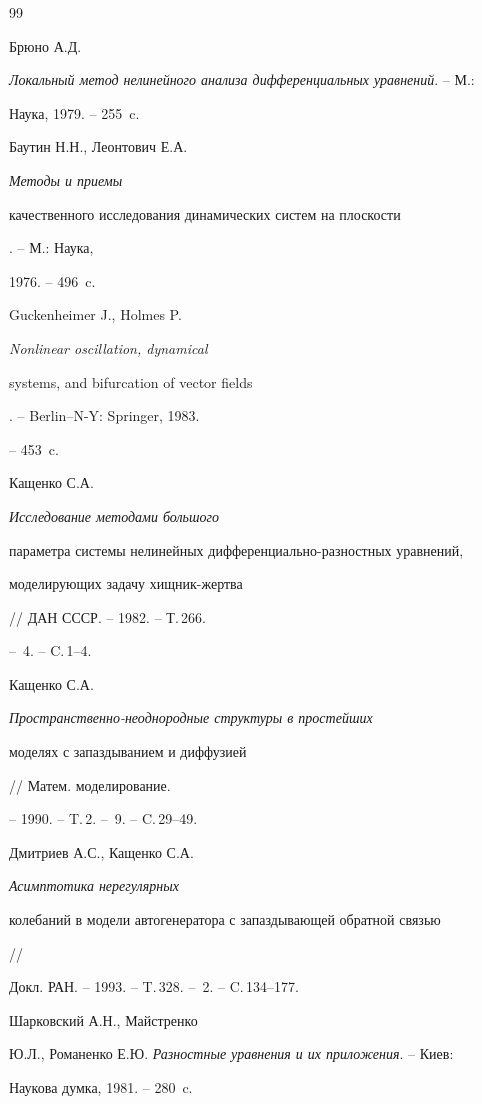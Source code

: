\begin{thebibliography}{99}


Брюно А.Д.


{\em Локальный метод нелинейного анализа дифференциальных уравнений}. -- М.:


Наука, 1979. -- 255~c.




Баутин Н.Н., Леонтович Е.А. {\em Методы и приемы


качественного исследования динамических систем на плоскости}. -- М.: Наука,


1976. -- 496~c.




Guckenheimer J., Holmes P. {\em Nonlinear oscillation, dynamical


systems, and bifurcation of vector fields}. -- Berlin--N-Y: Springer, 1983.


-- 453~c.




Кащенко С.А. {\em Исследование методами большого


параметра системы нелинейных дифференциально-разностных уравнений,


моделирующих задачу хищник-жертва} // ДАН СССР. -- 1982. -- Т.\,266.


-- \No\,4. -- C.\,1--4.




Кащенко С.А. {\em Пространственно-неоднородные структуры в простейших


моделях с запаздыванием и диффузией} // Матем. моделирование.


-- 1990. -- T.\,2. -- \No\,9. -- C.\,29--49.




Дмитриев А.С., Кащенко С.А. {\em Асимптотика нерегулярных


колебаний в модели автогенератора с запаздывающей обратной связью} //


Докл. РАН. -- 1993. -- T.\,328. -- \No\,2. -- C.\,134--177.




Шарковский А.Н., Майстренко


Ю.Л., Романенко Е.Ю. {\em Разностные уравнения и их приложения}. -- Киев:


Наукова думка, 1981. -- 280~c.





\end{thebibliography}





\vskip 2cm












\label{end}





